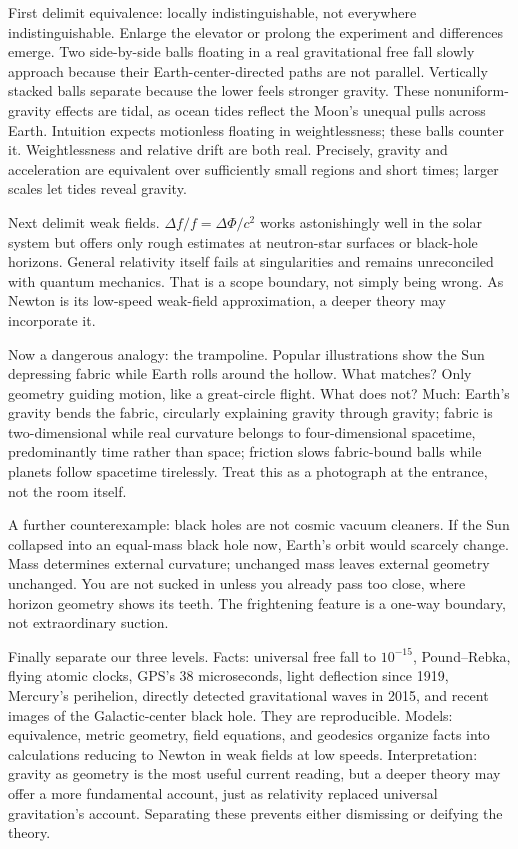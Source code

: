 \begin{mainline}
First delimit equivalence: locally indistinguishable, not everywhere indistinguishable. Enlarge the elevator or prolong the experiment and differences emerge. Two side-by-side balls floating in a real gravitational free fall slowly approach because their Earth-center-directed paths are not parallel. Vertically stacked balls separate because the lower feels stronger gravity. These nonuniform-gravity effects are tidal, as ocean tides reflect the Moon's unequal pulls across Earth. Intuition expects motionless floating in weightlessness; these balls counter it. Weightlessness and relative drift are both real. Precisely, gravity and acceleration are equivalent over sufficiently small regions and short times; larger scales let tides reveal gravity.

Next delimit weak fields. \(\Delta f/f=\Delta\Phi/c^{2}\) works astonishingly well in the solar system but offers only rough estimates at neutron-star surfaces or black-hole horizons. General relativity itself fails at singularities and remains unreconciled with quantum mechanics. That is a scope boundary, not simply being wrong. As Newton is its low-speed weak-field approximation, a deeper theory may incorporate it.

Now a dangerous analogy: the trampoline. Popular illustrations show the Sun depressing fabric while Earth rolls around the hollow. What matches? Only geometry guiding motion, like a great-circle flight. What does not? Much: Earth's gravity bends the fabric, circularly explaining gravity through gravity; fabric is two-dimensional while real curvature belongs to four-dimensional spacetime, predominantly time rather than space; friction slows fabric-bound balls while planets follow spacetime tirelessly. Treat this as a photograph at the entrance, not the room itself.

A further counterexample: black holes are not cosmic vacuum cleaners. If the Sun collapsed into an equal-mass black hole now, Earth's orbit would scarcely change. Mass determines external curvature; unchanged mass leaves external geometry unchanged. You are not sucked in unless you already pass too close, where horizon geometry shows its teeth. The frightening feature is a one-way boundary, not extraordinary suction.

Finally separate our three levels. Facts: universal free fall to \(10^{-15}\), Pound--Rebka, flying atomic clocks, GPS's 38 microseconds, light deflection since 1919, Mercury's perihelion, directly detected gravitational waves in 2015, and recent images of the Galactic-center black hole. They are reproducible. Models: equivalence, metric geometry, field equations, and geodesics organize facts into calculations reducing to Newton in weak fields at low speeds. Interpretation: gravity as geometry is the most useful current reading, but a deeper theory may offer a more fundamental account, just as relativity replaced universal gravitation's account. Separating these prevents either dismissing or deifying the theory.
\end{mainline}

